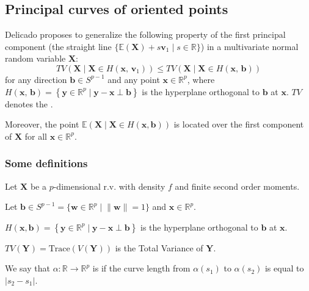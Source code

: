 \subsection{Principal curves of oriented points}

Delicado \cite{delicado_another_2001} proposes to generalize the following property of the
first principal component (the straight line
$\{\mathds{E}(\boldsymbol X) + s \boldsymbol v_1 \mid s \in \mathds{R}\}$)
in a multivariate normal random variable $\boldsymbol X$:
\begin{equation*}
	TV(\boldsymbol X \mid \boldsymbol X \in H(\boldsymbol x,\, \boldsymbol v_1))
	\leq
	TV(\boldsymbol X \mid \boldsymbol X \in H(\boldsymbol x,\, \boldsymbol b))
\end{equation*}
for any direction $\boldsymbol b \in S^{p-1}$ and any point $\boldsymbol x \in \mathds{R}^p$,
where $H(\boldsymbol x,\, \boldsymbol b) = \left\{
	\boldsymbol y \in \mathds{R}^p \mid \boldsymbol y - \boldsymbol x \perp \boldsymbol b
	\right\}$
is the hyperplane orthogonal to $\boldsymbol b$ at $\boldsymbol x$.
$TV$ denotes the .

Moreover, the point $\mathds{E}(\boldsymbol X \mid \boldsymbol X \in H(\boldsymbol x, \boldsymbol b))$
is located over the first component of $\boldsymbol X$ for all $\boldsymbol x \in \mathds{R}^p$.

\subsubsection{Some definitions}

Let $\boldsymbol X$ be a $p$-dimensional r.v. with density $f$ and finite
second order moments.

Let $\boldsymbol b \in S^{p-1} = \{\boldsymbol w \in \mathds{R}^p \mid
	\lVert \boldsymbol w \rVert = 1\}$ and $\boldsymbol x \in \mathds{R}^p$.

$H(\boldsymbol x, \boldsymbol b) = \left\{
	\boldsymbol y \in \mathds{R}^p \mid \boldsymbol y - \boldsymbol x \perp \boldsymbol b
	\right\}$ is the hyperplane orthogonal to $\boldsymbol b$ at $\boldsymbol x$.

$TV(\boldsymbol Y) = \text{Trace}(V(\boldsymbol Y))$ is the Total Variance of $\boldsymbol Y$.

We say that $\alpha : \mathds{R} \to \mathds{R}^p$ is 
if the curve length from $\alpha(s_1)$ to $\alpha(s_2)$ is equal to $|s_2 - s_1|$.

